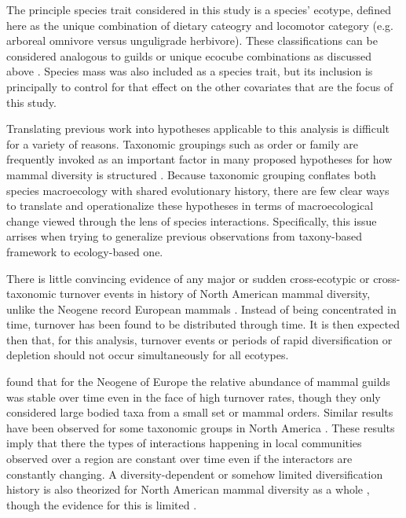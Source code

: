 \documentclass[12pt,letterpaper]{article}
\begin{document}
The principle species trait considered in this study is a species' ecotype, defined here as the unique combination of dietary cateogry and locomotor category (e.g. arboreal omnivore versus unguligrade herbivore). These classifications can be considered analogous to guilds or unique ecocube combinations as discussed above \citep{Bush2007,Bambach2007,Bush2011}. Species mass was also included as a species trait, but its inclusion is principally to control for that effect on the other covariates that are the focus of this study.

Translating previous work into hypotheses applicable to this analysis is difficult for a variety of reasons. Taxonomic groupings such as order or family are frequently invoked as an important factor in many proposed hypotheses for how mammal diversity is structured \citep{Quental2013,Slater2015c,Janis1993c,Pires2015a,Janis2008a}. Because taxonomic grouping conflates both species macroecology with shared evolutionary history, there are few clear ways to translate and operationalize these hypotheses in terms of macroecological change viewed through the lens of species interactions. Specifically, this issue arrises when trying to generalize previous observations from taxony-based framework to ecology-based one.

There is little convincing evidence of any major or sudden cross-ecotypic or cross-taxonomic turnover events in history of North American mammal diversity, unlike the Neogene record European mammals \citep{Alroy2009,Alroy1996a,Eronen2015,Janis1993b,Alroy2000g}. Instead of being concentrated in time, turnover has been found to be distributed through time. It is then expected then that, for this analysis, turnover events or periods of rapid diversification or depletion should not occur simultaneously for all ecotypes.

\citet{Jernvall2004} found that for the Neogene of Europe the relative abundance of mammal guilds was stable over time even in the face of high turnover rates, though they only considered large bodied taxa from a small set or mammal orders. Similar results have been observed for some taxonomic groups in North America \citep{Valkenburgh1999}. These results imply that there the types of interactions happening in local communities observed over a region are constant over time even if the interactors are constantly changing. A diversity-dependent or somehow limited diversification history is also theorized for North American mammal diversity as a whole \citep{Alroy2009,Rabosky2015b}, though the evidence for this is limited \citep{Harmon2015a}.
\end{document}
